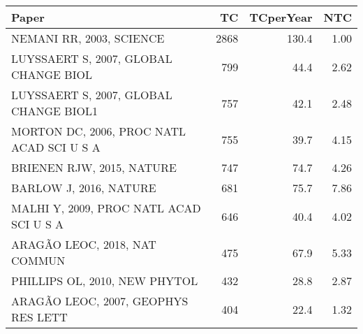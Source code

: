 
\begin{tabular}{lrrr}
\toprule
Paper & TC & TCperYear & NTC\\
\midrule
NEMANI RR, 2003, SCIENCE & 2868 & 130.4 & 1.00\\
LUYSSAERT S, 2007, GLOBAL CHANGE BIOL & 799 & 44.4 & 2.62\\
LUYSSAERT S, 2007, GLOBAL CHANGE BIOL1 & 757 & 42.1 & 2.48\\
MORTON DC, 2006, PROC NATL ACAD SCI U S A & 755 & 39.7 & 4.15\\
BRIENEN RJW, 2015, NATURE & 747 & 74.7 & 4.26\\
\addlinespace
BARLOW J, 2016, NATURE & 681 & 75.7 & 7.86\\
MALHI Y, 2009, PROC NATL ACAD SCI U S A & 646 & 40.4 & 4.02\\
ARAGÃO LEOC, 2018, NAT COMMUN & 475 & 67.9 & 5.33\\
PHILLIPS OL, 2010, NEW PHYTOL & 432 & 28.8 & 2.87\\
ARAGÃO LEOC, 2007, GEOPHYS RES LETT & 404 & 22.4 & 1.32\\
\bottomrule
\end{tabular}